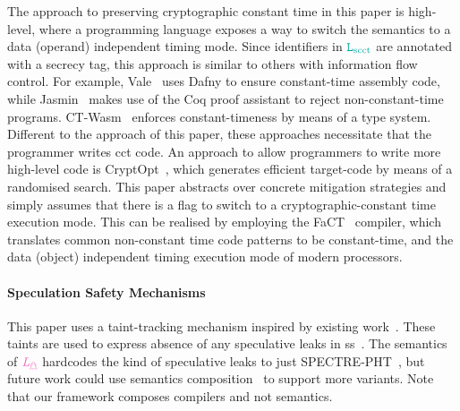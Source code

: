 \documentclass[acmsmall]{acmart}
\theoremstyle{definition}
\begin{document}
The approach to preserving cryptographic constant time in this paper is high-level, where a programming language exposes a way to switch the semantics to a data (operand) independent timing mode.
Since identifiers in $\Lscct$ are annotated with a secrecy tag, this approach is similar to others with information flow control.
For example, Vale~\cite{bond2017vale} uses Dafny to ensure constant-time assembly code, while Jasmin~\cite{almeida2017jasmin} makes use of the Coq proof assistant to reject non-constant-time programs.
CT-Wasm~\cite{watt2019ctwasm} enforces constant-timeness by means of a type system.
Different to the approach of this paper, these approaches necessitate that the programmer writes \gls*{cct} code.
An approach to allow programmers to write more high-level code is CryptOpt~\cite{kuepper2023cryptopt}, which generates efficient target-code by means of a randomised search.
This paper abstracts over concrete mitigation strategies and simply assumes that there is a flag to switch to a cryptographic-constant time execution mode.
This can be realised by employing the FaCT~\cite{cauligi2019fact} compiler, which translates common non-constant time code patterns to be constant-time, and the data (object) independent timing execution mode of modern processors.

\paragraph*{Speculation Safety Mechanisms}\label{subsec:relw:ssmechs}

This paper uses a taint-tracking mechanism inspired by existing work~\cite{guarnieri2018spectector,fabian2022automatic}.
These taints are used to express absence of any speculative leaks in \gls*{ss}~\cite{guarnieri2018spectector}. 
The semantics of $\Lspec$ hardcodes the kind of speculative leaks to just SPECTRE-PHT~\cite{kocher2019spectre}, but future work could use semantics composition~\cite{fabian2022automatic} to support more variants.
Note that our framework composes compilers and not semantics. 

\end{document}
